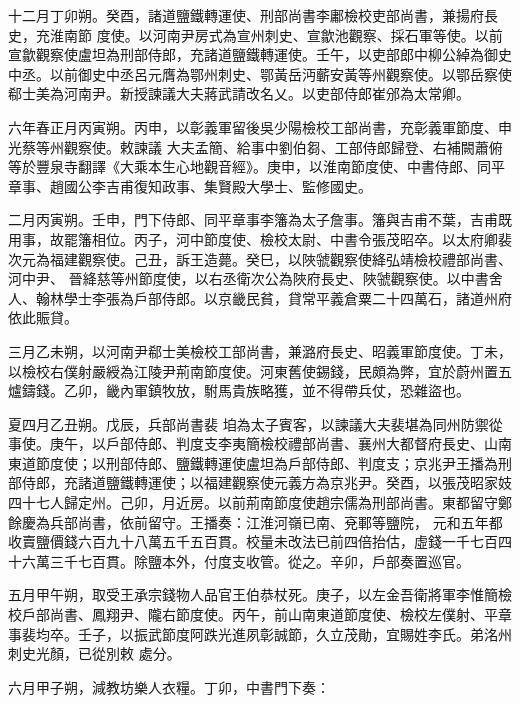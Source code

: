 \begin{pinyinscope}
 十二月丁卯朔。癸酉，諸道鹽鐵轉運使、刑部尚書李鄘檢校吏部尚書，兼揚府長史，充淮南節
 度使。以河南尹房式為宣州刺史、宣歙池觀察、採石軍等使。以前宣歙觀察使盧坦為刑部侍郎，充諸道鹽鐵轉運使。壬午，以吏部郎中柳公綽為御史中丞。以前御史中丞呂元膺為鄂州刺史、鄂黃岳沔蘄安黃等州觀察使。以鄂岳察使郗士美為河南尹。新授諫議大夫蔣武請改名乂。以吏部侍郎崔邠為太常卿。



 六年春正月丙寅朔。丙申，以彰義軍留後吳少陽檢校工部尚書，充彰義軍節度、申光蔡等州觀察使。敕諫議
 大夫孟簡、給事中劉伯芻、工部侍郎歸登、右補闕蕭俯等於豐泉寺翻譯《大乘本生心地觀音經》。庚申，以淮南節度使、中書侍郎、同平章事、趙國公李吉甫復知政事、集賢殿大學士、監修國史。



 二月丙寅朔。壬申，門下侍郎、同平章事李籓為太子詹事。籓與吉甫不葉，吉甫既用事，故罷籓相位。丙子，河中節度使、檢校太尉、中書令張茂昭卒。以太府卿裴次元為福建觀察使。己丑，訴王造薨。癸巳，以陜虢觀察使絳弘靖檢校禮部尚書、河中尹、
 晉絳慈等州節度使，以右丞衛次公為陜府長史、陜虢觀察使。以中書舍人、翰林學士李張為戶部侍郎。以京畿民貧，貸常平義倉粟二十四萬石，諸道州府依此賑貸。



 三月乙未朔，以河南尹郗士美檢校工部尚書，兼潞府長史、昭義軍節度使。丁未，以檢校右僕射嚴綬為江陵尹荊南節度使。河東舊使錫錢，民頗為弊，宜於蔚州置五爐鑄錢。乙卯，畿內軍鎮牧放，駙馬貴族略獲，並不得帶兵仗，恐雜盜也。



 夏四月乙丑朔。戊辰，兵部尚書裴
 垍為太子賓客，以諫議大夫裴堪為同州防禦從事使。庚午，以戶部侍郎、判度支李夷簡檢校禮部尚書、襄州大都督府長史、山南東道節度使；以刑部侍郎、鹽鐵轉運使盧坦為戶部侍郎、判度支；京兆尹王播為刑部侍郎，充諸道鹽鐵轉運使；以福建觀察使元義方為京兆尹。癸酉，以張茂昭家妓四十七人歸定州。己卯，月近房。以前荊南節度使趙宗儒為刑部尚書。東都留守鄭餘慶為兵部尚書，依前留守。王播奏：江淮河嶺已南、兗鄆等鹽院，
 元和五年都收賣鹽價錢六百九十八萬五千五百貫。校量未改法已前四倍抬估，虛錢一千七百四十六萬三千七百貫。除鹽本外，付度支收管。從之。辛卯，戶部奏置巡官。



 五月甲午朔，取受王承宗錢物人品官王伯恭杖死。庚子，以左金吾衛將軍李惟簡檢校戶部尚書、鳳翔尹、隴右節度使。丙午，前山南東道節度使、檢校左僕射、平章事裴均卒。壬子，以振武節度阿跌光進夙彰誠節，久立茂勛，宜賜姓李氏。弟洺州刺史光顏，已從別敕
 處分。



 六月甲子朔，減教坊樂人衣糧。丁卯，中書門下奏：




\end{pinyinscope}

